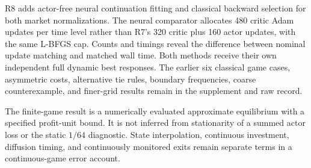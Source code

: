 R8 adds actor-free neural continuation fitting and classical backward selection for both market normalizations. The neural comparator allocates 480 critic Adam updates per time level rather than R7's 320 critic plus 160 actor updates, with the same L-BFGS cap. Counts and timings reveal the difference between nominal update matching and matched wall time. Both methods receive their own independent full dynamic best responses. The earlier six classical game cases, asymmetric costs, alternative tie rules, boundary frequencies, coarse counterexample, and finer-grid results remain in the supplement and raw record.

The finite-game result is a numerically evaluated approximate equilibrium with a specified profit-unit bound. It is not inferred from stationarity of a summed actor loss or the static $1/64$ diagnostic. State interpolation, continuous investment, diffusion timing, and continuously monitored exits remain separate terms in a continuous-game error account.
